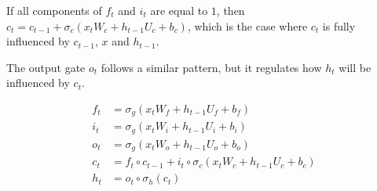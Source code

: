 If all components of $f_t$ and $i_t$ are equal to $1$, then $c_t = c_{t-1} + \sigma_c(x_t W_{c} + h_{t-1} U_{c} + b_c)$, which is the case where $c_t$ is fully influenced by $c_{t-1}$, $x$ and $h_{t-1}$.

The output gate $o_t$ follows a similar pattern, but it regulates how $h_t$ will be influenced by $c_t$.

\begin{align}
\label{eq:lstmequationsstart}     
f_t &= \sigma_g(x_t W_{f} + h_{t-1} U_{f} + b_f) \\
i_t &= \sigma_g(x_t W_{i} + h_{t-1} U_{i} + b_i) \\
o_t &= \sigma_g(x_t W_{o} + h_{t-1} U_{o} + b_o) \\
c_t &= f_t \circ c_{t-1} + i_t \circ \sigma_c(x_t W_{c} + h_{t-1} U_{c} + b_c) \\
\label{eq:lstmequationsend}
h_t &= o_t \circ \sigma_h(c_t)
    \end{align}


